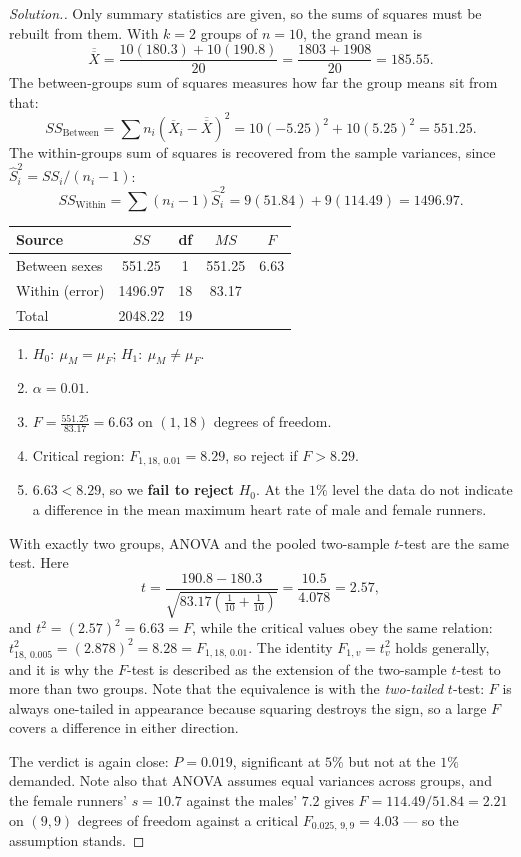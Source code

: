 \documentclass[11pt,a4paper]{article}
\theoremstyle{definition}
\newenvironment{solution}
  {\renewcommand{\qedsymbol}{}\begin{proof}[\textit{Solution}.]}
  {\end{proof}}
\begin{document}
\begin{solution}
Only summary statistics are given, so the sums of squares must be rebuilt from them. With
$k=2$ groups of $n=10$, the grand mean is
\[\overline{\overline{X}}=\frac{10(180.3)+10(190.8)}{20}=\frac{1803+1908}{20}=185.55.\]
The between-groups sum of squares measures how far the group means sit from that:
\[SS_{\text{Between}}=\sum n_i(\overline{X}_i-\overline{\overline{X}})^2
=10(-5.25)^2+10(5.25)^2=551.25.\]
The within-groups sum of squares is recovered from the sample variances, since
$\hat{S}_i^2=SS_i/(n_i-1)$:
\[SS_{\text{Within}}=\sum(n_i-1)\hat{S}_i^2=9(51.84)+9(114.49)=1496.97.\]
\begin{table}[H]
\centering
\begin{tabular}{lcccc}
Source & $SS$ & df & $MS$ & $F$\\
\hline
Between sexes & 551.25 & 1 & 551.25 & 6.63\\
Within (error) & 1496.97 & 18 & 83.17 & \\
\hline
Total & 2048.22 & 19 & & \\
\end{tabular}
\end{table}
\begin{enumerate}
\item $H_0:\ \mu_M=\mu_F$; $H_1:\ \mu_M\neq\mu_F$.
\item $\alpha=0.01$.
\item $F=\frac{551.25}{83.17}=6.63$ on $(1,18)$ degrees of freedom.
\item Critical region: $F_{1,18,\,0.01}=8.29$, so reject if $F>8.29$.
\item $6.63<8.29$, so we \textbf{fail to reject} $H_0$. At the $1\%$ level the data do not
indicate a difference in the mean maximum heart rate of male and female runners.
\end{enumerate}

With exactly two groups, ANOVA and the pooled two-sample $t$-test are the same test. Here
\[t=\frac{190.8-180.3}{\sqrt{83.17\left(\frac{1}{10}+\frac{1}{10}\right)}}
=\frac{10.5}{4.078}=2.57,\]
and $t^2=(2.57)^2=6.63=F$, while the critical values obey the same relation:
$t_{18,\,0.005}^2=(2.878)^2=8.28=F_{1,18,\,0.01}$. The identity $F_{1,v}=t_v^2$ holds
generally, and it is why the $F$-test is described as the extension of the two-sample
$t$-test to more than two groups. Note that the equivalence is with the \emph{two-tailed}
$t$-test: $F$ is always one-tailed in appearance because squaring destroys the sign, so a
large $F$ covers a difference in either direction.

The verdict is again close: $P=0.019$, significant at $5\%$ but not at the $1\%$ demanded.
Note also that ANOVA assumes equal variances across groups, and the female runners'
$s=10.7$ against the males' $7.2$ gives $F=114.49/51.84=2.21$ on $(9,9)$ degrees of freedom
against a critical $F_{0.025,\,9,9}=4.03$ --- so the assumption stands.
\end{solution}
\end{document}
